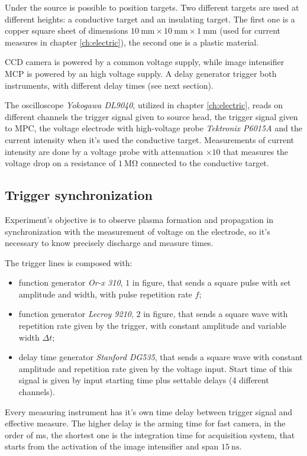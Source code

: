 Under the source is possible to position targets. Two different targets are used at different heights: a conductive target and an insulating target. The first one is a copper square sheet of dimensions $\SI{10}{\milli\meter} \times \SI{10}{\milli\meter} \times \SI{1}{\milli\meter}$ (used for current measures in chapter \ref{ch:electric}), the second one is a plastic material.

CCD camera is powered by a common voltage supply, while image intensifier MCP is powered by an high voltage supply. A delay generator trigger both instruments, with different delay times (see next section).

The oscilloscope \emph{Yokogawa DL9040}, utilized in chapter \ref{ch:electric}, reads on different channels the trigger signal given to source head, the trigger signal given to MPC, the voltage electrode with high-voltage probe \emph{Tektronix P6015A} and the current intensity when it's used the conductive target. Measurements of current intensity are done by a voltage probe with attenuation $\times \num{10}$ that measures the voltage drop on a resistance of $\SI{1}{\mega\ohm}$ connected to the conductive target.

\subsection{Trigger synchronization}
Experiment's objective is to observe plasma formation and propagation in synchronization with the measurement of voltage on the electrode, so it's necessary to know precisely discharge and measure times.

The trigger lines is composed with:
\begin{itemize}
 \item function generator \emph{Or-x 310}, $1$ in figure, that sends a square pulse with set amplitude and width, with pulse repetition rate $f$;
 \item function generator \emph{Lecroy 9210}, $2$ in figure, that sends a square wave with repetition rate given by the trigger, with constant amplitude and variable width $\Delta t$;
 \item delay time generator \emph{Stanford DG535}, that sends a square wave with constant amplitude and repetition rate given by the voltage input. Start time of this signal is given by input starting time plus settable delays (4 different channels).
\end{itemize}

Every measuring instrument has it's own time delay between trigger signal and effective measure. The higher delay is the arming time for fast camera, in the order of \si{\milli\second}, the shortest one is the integration time for acquisition system, that starts from the activation of the image intensifier and span $\SI{15}{\nano\second}$.

